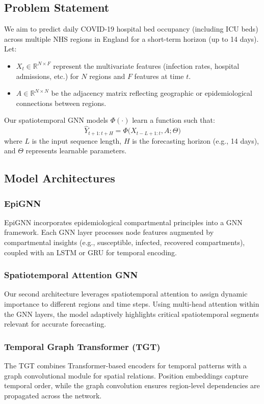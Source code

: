 \documentclass[lettersize, journal]{IEEEtran}
\begin{document}
\subsection{Problem Statement}
We aim to predict daily COVID-19 hospital bed occupancy (including ICU beds) across multiple NHS regions in England for a short-term horizon (up to 14 days). Let:
\begin{itemize}
    \item $X_{t} \in \mathbb{R}^{N \times F}$ represent the multivariate features (infection rates, hospital admissions, etc.) for $N$ regions and $F$ features at time $t$.
    \item $A \in \mathbb{R}^{N \times N}$ be the adjacency matrix reflecting geographic or epidemiological connections between regions.
\end{itemize}
Our spatiotemporal GNN models $\Phi(\cdot)$ learn a function such that:
\[
    \hat{Y}_{t+1:t+H} = \Phi\big(X_{t-L+1:t}, A; \Theta\big)
\]
where $L$ is the input sequence length, $H$ is the forecasting horizon (e.g., 14 days), and $\Theta$ represents learnable parameters.

\subsection{Model Architectures}
\subsubsection{EpiGNN}
EpiGNN incorporates epidemiological compartmental principles into a GNN framework. Each GNN layer processes node features augmented by compartmental insights (e.g., susceptible, infected, recovered compartments), coupled with an LSTM or GRU for temporal encoding.

\subsubsection{Spatiotemporal Attention GNN}
Our second architecture leverages spatiotemporal attention to assign dynamic importance to different regions and time steps. Using multi-head attention within the GNN layers, the model adaptively highlights critical spatiotemporal segments relevant for accurate forecasting.

\subsubsection{Temporal Graph Transformer (TGT)}
The TGT combines Transformer-based encoders for temporal patterns with a graph convolutional module for spatial relations. Position embeddings capture temporal order, while the graph convolution ensures region-level dependencies are propagated across the network.
\end{document}
